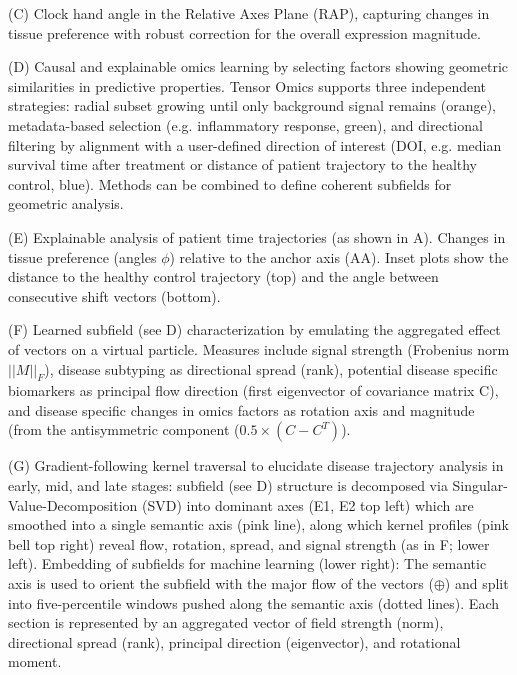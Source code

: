 \documentclass{article}
\begin{document}
\vspace{0.5cm}
(C) Clock hand angle in the Relative Axes Plane (RAP), capturing changes in tissue preference with robust correction for the overall expression magnitude.

\vspace{0.5cm}
(D) Causal and explainable omics learning by selecting factors showing geometric similarities in predictive properties. Tensor Omics supports three independent strategies: radial subset growing until only background signal remains (orange), metadata-based selection (e.g. inflammatory response, green), and directional filtering by alignment with a user-defined direction of interest (DOI, e.g. median survival time after treatment or distance of patient trajectory to the healthy control, blue). Methods can be combined to define coherent subfields for geometric analysis.

\vspace{0.5cm}
(E) Explainable analysis of patient time trajectories (as shown in A). Changes in tissue preference (angles $\phi$) relative to the anchor axis (AA). Inset plots show the distance to the healthy control trajectory (top) and the angle between consecutive shift vectors (bottom).

\vspace{0.5cm}
(F) Learned subfield (see D) characterization by emulating the aggregated effect of vectors on a virtual particle. Measures include signal strength (Frobenius norm $||M||_F$), disease subtyping as directional spread (rank), potential disease specific biomarkers as principal flow direction (first eigenvector of covariance matrix C), and disease specific changes in omics factors as rotation axis and magnitude (from the antisymmetric component ($0.5 \times (C - C^T)$).

\vspace{0.5cm}
(G) Gradient-following kernel traversal to elucidate disease trajectory analysis in early, mid, and late stages: subfield (see D) structure is decomposed via Singular-Value-Decomposition (SVD) into dominant axes (E1, E2 top left) which are smoothed into a single semantic axis (pink line), along which kernel profiles (pink bell top right) reveal flow, rotation, spread, and signal strength (as in F; lower left). Embedding of subfields for machine learning (lower right): The semantic axis is used to orient the subfield with the major flow of the vectors ($\oplus$) and split into five-percentile windows pushed along the semantic axis (dotted lines). Each section is represented by an aggregated vector of field strength (norm), directional spread (rank), principal direction (eigenvector), and rotational moment.
\end{document}
